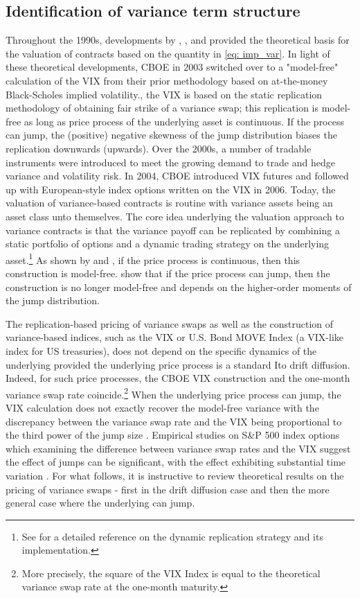 \documentclass[12pt]{article}
\begin{document}
\subsection{Identification of variance term structure}\label{subsec: vs}
Throughout the 1990s, developments by \cite{neuberger1994log}, \cite{dupire1994pricing}, \cite{carr1998towards} and \cite{demeterfi1999} provided the theoretical basis for the valuation of contracts based on the quantity in \eqref{eq: imp_var}. In light of these theoretical developments, CBOE in 2003 switched over to a "model-free" calculation of the VIX from their prior methodology based on at-the-money Black-Scholes implied volatility.\cite{carr2012variance}, the VIX is based on the static replication methodology of obtaining fair strike of a variance swap; this replication is model-free as long as price process of the underlying asset is continuous. If the process can jump, the (positive) negative skewness of the jump distribution biases the replication downwards (upwards).  Over the 2000s, a number of tradable instruments were introduced to meet the growing demand to trade and hedge variance and volatility risk. In 2004, CBOE introduced VIX futures and followed up with European-style index options written on the VIX in 2006. Today, the valuation of variance-based contracts is routine with variance assets being an asset class unto themselves. The core idea underlying the valuation approach to variance contracts is that the variance payoff can be replicated by combining a static portfolio of options and a dynamic trading strategy on the underlying asset.\footnote{See \cite{bossu2005just} for a detailed reference on the dynamic replication strategy and its implementation. } As shown by \cite{britten2000option} and \cite{jiang2005model}, if the price process is continuous, then this construction is model-free. \cite{carr2012variance} show that if the price process can jump, then the construction is no longer model-free and depends on the higher-order moments of the jump distribution. 

The replication-based pricing of variance swaps as well as the construction of variance-based indices, such as the VIX or U.S. Bond MOVE Index (a VIX-like index for US treasuries),  does not depend on the specific dynamics of the underlying provided the underlying price process is a standard Ito drift diffusion. Indeed, for such price processes, the CBOE VIX construction and the one-month variance swap rate coincide.\footnote{More precisely, the square of the VIX Index is equal to the theoretical variance swap rate at the one-month maturity. } When the underlying price process can jump, the VIX calculation does not exactly recover the model-free variance with the discrepancy between the variance swap rate and the VIX being proportional to the third power of the jump size \citep{jiang2005model}. Empirical studies on S\&P 500 index options which examining the difference between variance swap rates and the VIX suggest the effect of jumps can be significant, with the effect exhibiting substantial time variation \citep{carr2012variance, ait2020term}. For what follows, it is instructive to review theoretical results on the pricing of variance swaps - first in the drift diffusion case and then the more general case where the underlying can jump.
\end{document}
